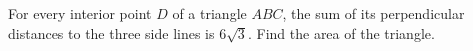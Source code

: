 For every interior point $D$ of a triangle $ABC$, the sum of its perpendicular distances to the three side lines is $6\sqrt3$. Find the area of the triangle.
